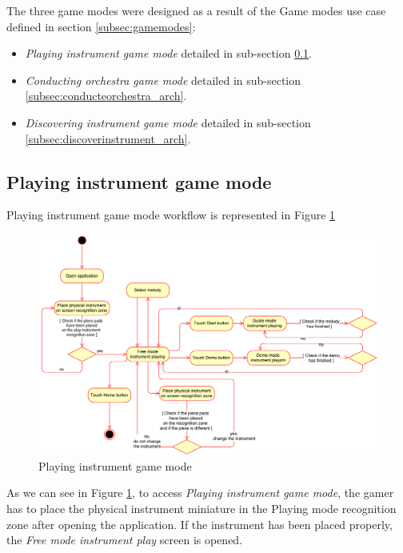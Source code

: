 The three game modes were designed as a result of the Game modes use case defined in section \ref{subsec:gamemodes}:

\begin{itemize}
\item \textit{Playing instrument game mode} detailed in sub-section \ref{subsec:playinstrument_arch}.
\item \textit{Conducting orchestra game mode} detailed in sub-section \ref{subsec:conducteorchestra_arch}.
\item \textit{Discovering instrument game mode}  detailed in sub-section \ref{subsec:discoverinstrument_arch}.
\end{itemize}

\newpage
\subsection{Playing instrument game mode}
\label{subsec:playinstrument_arch}

Playing instrument game mode workflow is represented in Figure \ref{fig:playingworkflow}

\begin{figure}[ht!]
	\centering
	\includegraphics[width=400pt]{graphics/architecture/PlayingGameMode.pdf}
	\caption{Playing instrument game mode}
	\label{fig:playingworkflow}
\end{figure}

As we can see in Figure \ref{fig:playingworkflow}, to access \textit{Playing instrument game mode}, the gamer has to place the physical instrument miniature in the Playing mode recognition zone after opening the application. If the instrument has been placed properly, the \textit{Free mode instrument play} screen is opened.

